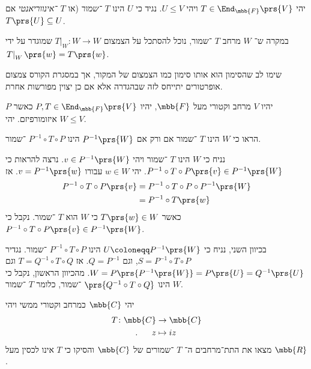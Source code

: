 \documentclass[a4paper,10pt,twoside,openany]{book}
\begin{document}
\begin{definition}
יהי
$T \in \End_{\mbb{F}}\prs{V}$
ויהי
$U \leq V$.
נגיד כי
$U$
הינו
\emph{$T$%
־שמור} (או
\emph{$T$%
־אינווריאנטי}
אם
$T\prs{U} \subseteq U$.
\end{definition}

\begin{definition}
במקרה ש־%
$W$
מרחב
$T$%
־שמור, נוכל להסתכל על הצמצום
$\left. T \right|_W \colon W \to W$
שמוגדר על ידי
$\left. T \right|_W \prs{w} = T\prs{w}$.
\end{definition}

\begin{remark}
שימו לב שהסימון הוא אותו סימון כמו הצמצום של המקור, אך במסגרת הקורס צמצום אופרטורים יתייחס לזה שבהגדרה אלא אם כן יצוין מפורשות אחרת.
\end{remark}

\begin{exercisechap}
יהיו
$V$
מרחב וקטורי
מעל
$\mbb{F}$,
יהיו
$P,T \in \End_{\mbb{F}}\prs{V}$
כאשר
$P$
איזומורפיזם.
יהי
$W \leq V$.

הראו כי
$W$
הינו
$T$%
־שמור אם ורק אם
$P^{-1}\prs{W}$
הינו
$P^{-1} \circ T \circ P$%
־שמור.
\end{exercisechap}

\begin{solution}
נניח כי
$W$
הינו
$T$%
־שמור ויהי
$v \in P^{-1}\prs{W}$.
נרצה להראות כי
$P^{-1} \circ T \circ P \prs{v} \in P^{-1}\prs{W}$.
יהי
$w \in W$
עבורו
$v = P^{-1}\prs{w}$.
אז
\begin{align*}
P^{-1} \circ T \circ P \prs{v} &= P^{-1} \circ T \circ P \circ P^{-1}\prs{W}
\\&= P^{-1} \circ T \prs{w}
\end{align*}
כאשר
$T\prs{w} \in W$
כי
$W$
הוא
$T$%
־שמור. נקבל כי
$P^{-1} \circ T \circ P \prs{v} \in P^{-1}\prs{W}$.

בכיוון השני, נניח כי
$U \coloneqq P^{-1}\prs{W}$
הינו
$P^{-1} \circ T \circ P$%
־שמור.
נגדיר
$S = P^{-1} \circ T \circ P$,
וגם
$Q = P^{-1}$.
אז
$T = Q^{-1} \circ T \circ Q$
וגם
$W = P\prs{P^{-1}\prs{W}} = P\prs{U} = Q^{-1}\prs{U}$.
מהכיוון הראשון, נקבל כי
$W$
הינו
$\prs{Q^{-1} \circ T \circ Q}$%
־שמור, כלומר
$T$%
־שמור.
\end{solution}

\begin{exercisechap}
יהי
$\mbb{C}$
כמרחב וקטורי ממשי ויהי
\begin{align*}
T \colon \mbb{C} &\to \mbb{C} \\
\text{.} \hphantom{lala} z &\mapsto iz
\end{align*}
מצאו את התת־מרחבים ה־%
$T$%
־שמורים של
$\mbb{C}$
והסיקו כי
$T$
אינו לכסין מעל
$\mbb{R}$.
\end{exercisechap}
\end{document}
